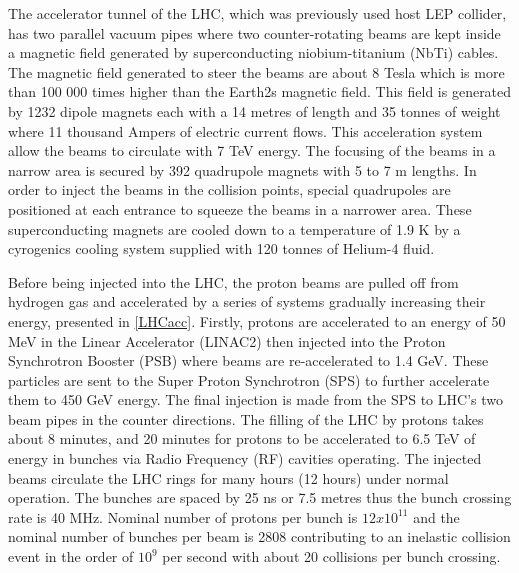 The accelerator tunnel of the LHC, which was previously used host LEP collider, has two parallel vacuum pipes where two counter-rotating beams are kept inside a magnetic field generated by superconducting niobium-titanium (NbTi) cables. The magnetic field generated to steer the beams are about 8 Tesla which is more than 100 000 times higher than the Earth2s magnetic field. This field is generated by  1232 dipole magnets each with a 14 metres of length and 35 tonnes of weight where 11 thousand Ampers of electric current flows. This acceleration system allow the beams to circulate with 7 TeV energy. The focusing of the beams in a narrow area is secured by 392 quadrupole magnets with 5 to 7 m lengths. In order to inject the beams in the collision points, special quadrupoles are positioned at each entrance to squeeze the beams in a narrower area. These superconducting magnets are cooled down to a temperature of 1.9 K by a cyrogenics cooling system supplied with 120 tonnes of Helium-4 fluid.

Before being injected into the LHC, the proton beams are pulled off from hydrogen gas and accelerated by a series of systems gradually increasing their energy, presented in \autoref{LHCacc}. Firstly, protons are accelerated to an energy of 50 MeV in the Linear Accelerator (LINAC2) then injected into the Proton Synchrotron Booster (PSB) where beams are re-accelerated to 1.4 GeV. These particles are sent to the Super Proton Synchrotron (SPS) to further accelerate them to 450 GeV energy. The final injection is made from the SPS to LHC's two beam pipes in the counter directions. The filling of the LHC by protons takes about 8 minutes, and 20 minutes for protons to be accelerated to 6.5 TeV of energy in bunches via Radio Frequency (RF) cavities operating. The injected beams circulate the LHC rings for many hours (12 hours) under normal operation. The bunches are spaced by 25 ns or 7.5 metres thus the bunch crossing rate is 40 MHz. Nominal number of protons per bunch is $12x10^{11}$ and the nominal number of bunches per beam is 2808 contributing to an inelastic collision event in the order of $10^9$ per second with about 20 collisions per bunch crossing.

